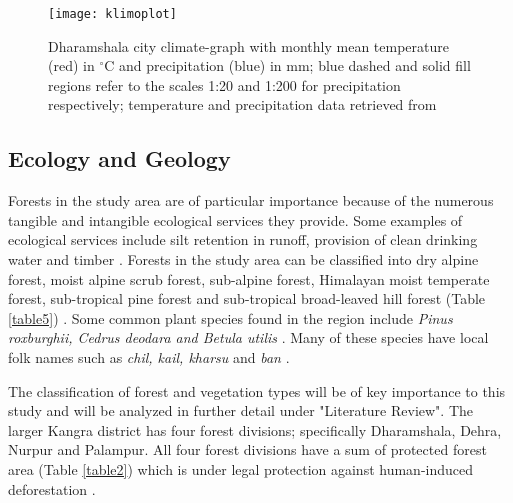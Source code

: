 \begin{figure}[H]
	\texttt{[image: klimoplot]}
	\centering
	\caption{Dharamshala city climate-graph with monthly mean temperature (red) in $^\circ$C and precipitation (blue) in mm; blue dashed and solid fill regions refer to the scales 1:20 and 1:200 for precipitation respectively; temperature and precipitation data retrieved from } \label{Fig2}
\end{figure}
\vspace{-12pt}

\subsection{Ecology and Geology}

\justify
Forests in the study area are of particular importance because of the numerous tangible and intangible ecological services they provide. Some examples of ecological services include silt retention in runoff, provision of clean drinking water and timber . Forests in the study area can be classified into dry alpine forest, moist alpine scrub forest, sub-alpine forest, Himalayan moist temperate forest, sub-tropical pine forest and sub-tropical broad-leaved hill forest (Table \ref{table5}) \citep{Kumar2015}. Some common plant species found in the region include \textit{Pinus roxburghii, Cedrus deodara and Betula utilis} . Many of these species have local folk names such as \textit{chil, kail, kharsu} and \textit{ban} .

\justify
The classification of forest and vegetation types will be of key importance to this study and will be analyzed in further detail under "Literature Review". The larger Kangra district has four forest divisions; specifically Dharamshala, Dehra, Nurpur and Palampur. All four forest divisions have a sum of protected forest area (Table \ref{table2}) which is under legal protection against human-induced deforestation .

